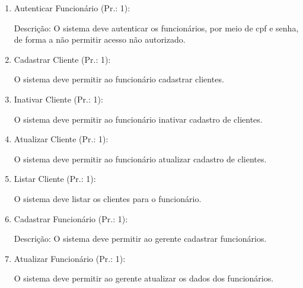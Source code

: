 \begin{enumerate}[
	label=RF\arabic{*}, 
	ref=(RF\arabic{*}),
	leftmargin=1.5em,
	itemindent=4.5em]
	

\item Autenticar Funcionário (Pr.: 1):\par
Descrição: O sistema deve autenticar os funcionários, por meio de cpf e senha, de forma a não permitir acesso não autorizado.\par

\item Cadastrar Cliente (Pr.: 1):\par
O sistema deve permitir ao funcionário cadastrar clientes.\par

\item Inativar Cliente (Pr.: 1):\par
O sistema deve permitir ao funcionário inativar cadastro de clientes.\par

\item Atualizar Cliente (Pr.: 1):\par
O sistema deve permitir ao funcionário atualizar cadastro de clientes.\par

\item Listar Cliente (Pr.: 1):\par
O sistema deve listar os clientes para o funcionário.\par

\item Cadastrar Funcionário (Pr.: 1):\par
Descrição: O sistema deve permitir ao gerente cadastrar funcionários.\par

\item  Atualizar Funcionário (Pr.: 1):\par
O sistema deve permitir ao gerente atualizar os dados dos funcionários.\par


\end{enumerate}
